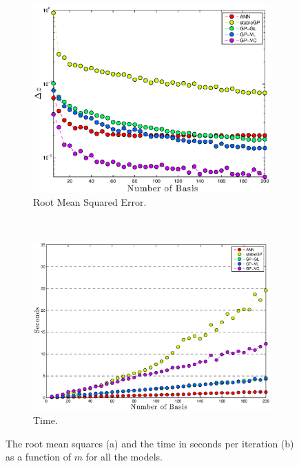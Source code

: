 \documentclass[useAMS,usenatbib,fleqn]{mn2e}
\begin{document}
\begin{figure}
        \centering
        
        \begin{subfigure}[b]{0.45\textwidth}
                \includegraphics[width=\textwidth]{figures/different-basis.eps}
                 \caption{Root Mean Squared Error.}
                 \label{fig-rmses}
        \end{subfigure}
	 ~
       \begin{subfigure}[b]{0.45\textwidth}
                \includegraphics[width=\textwidth]{figures/times.eps}
                 \caption{Time.}
                 \label{fig-time-seconds}
        \end{subfigure}

       \caption{The root mean squares (a) and the time in seconds per iteration (b) as a function of $m$ for all the models.}	
\end{figure}
\end{document}
